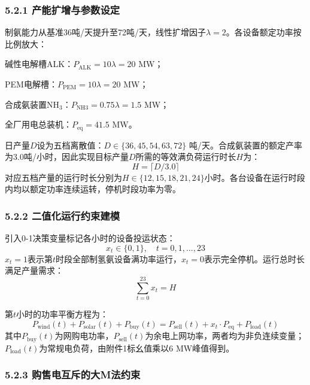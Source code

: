 \documentclass[zihao=-4,a4paper]{ctexart} %
\begin{document}
	\subsubsection*{5.2.1 产能扩增与参数设定}
	
	制氨能力从基准36吨/天提升至72吨/天，线性扩增因子$\lambda=2$。各设备额定功率按比例放大：
	\par 碱性电解槽ALK：$P_{\text{ALK}} = 10\lambda = 20$ MW；
	\par PEM电解槽：$P_{\text{PEM}} = 10\lambda = 20$ MW；
	\par 合成氨装置NH$_3$：$P_{\text{NH3}} = 0.75\lambda = 1.5$ MW；
	\par 全厂用电总装机：$P_{\text{eq}} = 41.5$ MW。
	
	日产量$D$设为五档离散值：$D \in \{36,45,54,63,72\}$ 吨/天。合成氨装置的额定产率为3.0吨/小时，因此实现目标产量$D$所需的等效满负荷运行时长$H$为：
	\begin{equation}
		H = \lceil D / 3.0 \rceil
		\label{eq:q2_hours}
	\end{equation}
	对应五档产量的运行时长分别为$H \in \{12,15,18,21,24\}$小时。各台设备在运行时段内均以额定功率连续运转，停机时段功率为零。
	
	\subsubsection*{5.2.2 二值化运行约束建模}
	
	引入0-1决策变量标记各小时的设备投运状态：
	\begin{equation}
		x_t \in \{0,1\},\quad t=0,1,\dots,23
		\label{eq:q2_binary}
	\end{equation}
	$x_t=1$表示第$t$时段全部制氢氨设备满功率运行，$x_t=0$表示完全停机。运行总时长满足产量需求：
	\begin{equation}
		\sum_{t=0}^{23} x_t = H
		\label{eq:q2_sum}
	\end{equation}
	
	第$t$小时的功率平衡方程为：
	\begin{equation}
		P_{\text{wind}}(t) + P_{\text{solar}}(t) + P_{\text{buy}}(t) = P_{\text{sell}}(t) + x_t \cdot P_{\text{eq}} + P_{\text{load}}(t)
		\label{eq:q2_balance}
	\end{equation}
	其中$P_{\text{buy}}(t)$为网购电功率，$P_{\text{sell}}(t)$为余电上网功率，两者均为非负连续变量；$P_{\text{load}}(t)$为常规电负荷，由附件1标幺值乘以6 MW峰值得到。
	
	\subsubsection*{5.2.3 购售电互斥的大M法约束}
	
\end{document}
